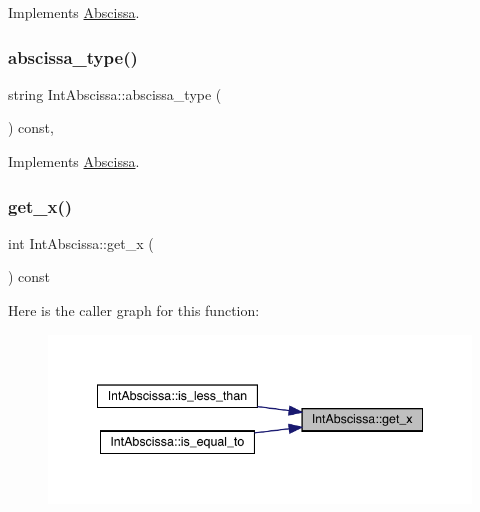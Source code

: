 Implements \mbox{\hyperlink{classAbscissa_af57ffcd07eee633bb2313bc7a932f3bb}{Abscissa}}.

\mbox{\label{classIntAbscissa_a3d21dd199d2e7623429fadce5092ac88}} 
\subsubsection{\texorpdfstring{abscissa\_type()}{abscissa\_type()}\hspace{0.1cm}{\footnotesize\ttfamily [2/2]}}
{\footnotesize\ttfamily string Int\+Abscissa\+::abscissa\+\_\+type (\begin{DoxyParamCaption}{ }\end{DoxyParamCaption}) const\hspace{0.3cm}{\ttfamily [inline]}, {\ttfamily [virtual]}}



Implements \mbox{\hyperlink{classAbscissa_af57ffcd07eee633bb2313bc7a932f3bb}{Abscissa}}.

\mbox{\label{classIntAbscissa_a6aea2db3e6bce733454102f2cafab3a0}} 
\subsubsection{\texorpdfstring{get\_x()}{get\_x()}\hspace{0.1cm}{\footnotesize\ttfamily [1/2]}}
{\footnotesize\ttfamily int Int\+Abscissa\+::get\+\_\+x (\begin{DoxyParamCaption}{ }\end{DoxyParamCaption}) const\hspace{0.3cm}{\ttfamily [inline]}}

Here is the caller graph for this function\+:
\nopagebreak
\begin{figure}[H]
\begin{center}
\leavevmode
\includegraphics[width=341pt]{d1/dd9/classIntAbscissa_a6aea2db3e6bce733454102f2cafab3a0_icgraph}
\end{center}
\end{figure}
\mbox{\label{classIntAbscissa_a6aea2db3e6bce733454102f2cafab3a0}} 
